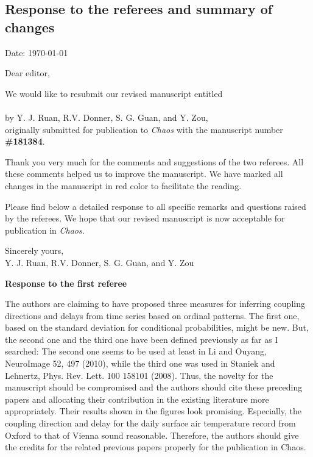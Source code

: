 \documentclass[aps,chaos,superscriptaddress,showkeys]{revtex4}
\begin{document}
\begin{center}
\section*{ \Large {Response to the referees and summary of changes} }
Date: {\today}
\end{center}

\noindent Dear editor,

\vspace{0.6cm}
We would like to resubmit our revised manuscript entitled \\

 \\

\noindent by Y. J. Ruan, R.V. Donner, S. G. Guan, and Y. Zou, \\

\noindent originally submitted for publication to \emph{Chaos} with the manuscript number {\bf \#181384}.

\vspace{0.6cm}
Thank you very much for the comments and suggestions of the two
referees. All these comments helped us to improve the manuscript. We have
marked all changes in the manuscript in red color to facilitate the reading.

\vspace{0.6cm}

Please find below a detailed response to all specific remarks and questions
raised by the referees. We hope that our revised manuscript is now acceptable for
publication in \emph{Chaos}.

\vspace{0.6cm}
\noindent
Sincerely yours,\\

\vspace{0.1cm}
\noindent
Y. J. Ruan, R.V. Donner, S. G. Guan, and Y. Zou


\newpage
\begin{center}
{\bf Response to the first referee}
\end{center}


{\sf The authors are claiming to have proposed three measures for inferring coupling directions and delays from time series based on ordinal patterns. The first one, based on the standard deviation for conditional probabilities, might be new. But, the second one and the third one have been defined previously as far as I searched: The second one seems to be used at least in Li and Ouyang, NeuroImage 52, 497 (2010), while the third one was used in Staniek and Lehnertz, Phys. Rev. Lett. 100 158101 (2008). Thus, the novelty for the manuscript should be compromised and the authors should cite these preceding papers and allocating their contribution in the existing literature more appropriately. Their results shown in the figures look promising. Especially, the coupling direction and delay for the daily surface air temperature record from Oxford to that of Vienna sound reasonable. Therefore, the authors should give the credits for the related previous papers properly for the publication in Chaos. }
\end{document}
